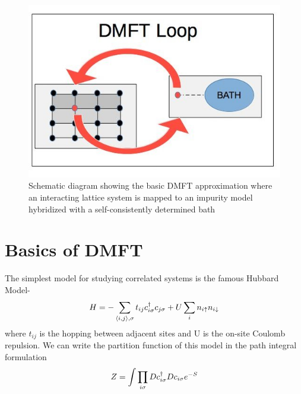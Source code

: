 \documentclass[10pt]{ruthesis}
\begin{document}
\begin{figure}[thbp]\label{DMFT_pic}
\begin{center}
\includegraphics[width=0.7\columnwidth]{dmft_image.jpg}
\caption{Schematic diagram showing the basic DMFT approximation where an interacting lattice system is mapped to an impurity model hybridized with a self-consistently determined bath \protect \footnotemark}
\end{center}

\end{figure}


\section{Basics of DMFT}



The simplest model for studying correlated systems is the famous Hubbard Model-
\begin{equation}
H=- \sum_{\langle i,j \rangle, \sigma} t_{ij} c^{\dagger}_{i \sigma} c_{j\sigma} + U \sum_{i} n_{i\uparrow} n_{i \downarrow}
\end{equation}
 where $t_{ij} $ is the hopping between adjacent sites and U is the on-site Coulomb repulsion.  We can write the partition function of this model in the path integral formulation 
 \begin{equation}\label{Part}
 Z=\int \prod_{i\sigma} D c^{\dagger}_{i\sigma} D c_{i\sigma} e^{-S}
 \end{equation}
\end{document}
